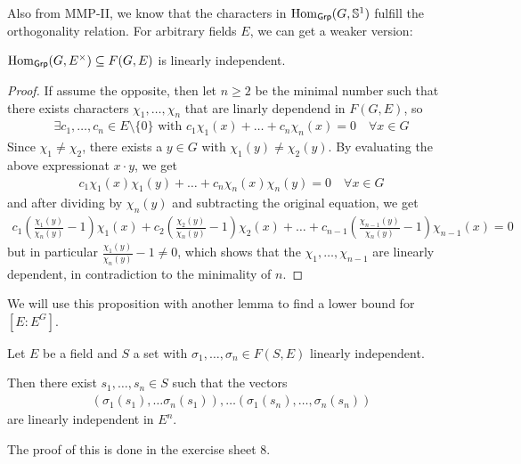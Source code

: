 Also from MMP-II, we know that the characters in $\operatorname{Hom}_{\text{\sffamily Grp}}(G,\mathbb{S}^{1})$ fulfill the orthogonality relation.
For arbitrary fields $E$, we can get a weaker version:

\begin{prop}[Dedekind]\label{prop:dedekind}
  $\operatorname{Hom}_{\text{\sffamily Grp}}(G,E^{\times}) \subseteq F(G,E)$ is linearly independent.
\end{prop}
\begin{proof}
  If assume the opposite, then let $n \geq 2$ be the minimal number such that there exists characters $\chi_1, \ldots, \chi_n$ that are linarly dependend in $F(G,E)$, so
  \begin{align*}
    \exists c_1, \ldots, c_n \in E \setminus \{0\} \text{ with } c_1 \chi_1(x) + \ldots + c_n \chi_n(x) = 0 \quad \forall x \in G
  \end{align*}
  Since $\chi_1 \neq \chi_2$, there exists a $y \in G$ with $\chi_1(y) \neq \chi_2(y)$.
  By evaluating the above expressionat $x \cdot y$, we get
  \begin{align*}
    c_1 \chi_1(x) \chi_1(y) + \ldots + c_n \chi_n(x) \chi_n(y) = 0 \quad \forall  x \in G
  \end{align*}
  and after dividing by $\chi_n(y)$ and subtracting the original equation, we get
  \begin{align*}
    c_1 \left(
      \frac{\chi_1(y)}{\chi_n(y)} - 1
    \right)
    \chi_1(x)
    +
    c_2 \left(
      \frac{\chi_2(y)}{\chi_n(y)} - 1
    \right)
    \chi_2(x)
    + \ldots
    +
    c_{n-1} \left(
      \frac{\chi_{n-1}(y)}{\chi_n(y)} - 1
    \right)
    \chi_{n-1}(x)
    =
    0
  \end{align*}
  but in particular $\frac{\chi_1(y)}{\chi_n(y)} - 1 \neq 0$, which shows that the $\chi_{1}, \ldots, \chi_{n-1}$ are linearly dependent, in contradiction to the minimality of $n$.
\end{proof}

We will use this proposition with another lemma to find a lower bound for $[E:E^{G}]$. 


\begin{lemma}[]\label{lem:4-6}
  Let $E$ be a field and $S$ a set with $\sigma_{1}, \ldots, \sigma_{n} \in F(S,E)$ linearly independent.

  Then there exist $s_{1}, \ldots, s_{n} \in S$ such that the vectors
  \begin{align*}
    (\sigma_1(s_1), \ldots \sigma_n(s_1)), \ldots (\sigma_1(s_n), \ldots, \sigma_n(s_n))
  \end{align*}
  are linearly independent in $E^{n}$.
\end{lemma}
The proof of this is done in the exercise sheet 8.


